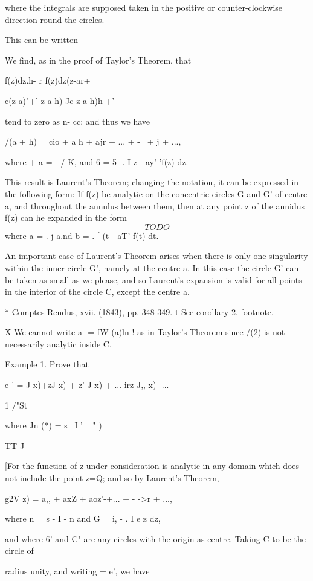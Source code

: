 {{where the integrals are supposed taken in the positive or
counter-clockwise direction round the circles.

This can be written

We find, as in the proof of Taylor's Theorem, that

f(z)dz.h- r f(z)dz(z-ar+

c(z-a)"+' z-a-h) Jc z-a-h)h +'

tend to zero as n- cc; and thus we have

/(a + h) = cio + a h + ajr + ... + -~ + j + ...,

where + a = - / K, and 6 = 5- . I z - ay'-'f(z) dz.

This result is Laurent's Theorem; changing the notation, it can be
expressed in the following form: If f(z) be analytic on the concentric
circles G and G' of centre a, and throughout the annulus between them,
then at any point z of the annidus f(z) can he expanded in the form
$$
TODO
$$
where a = . j a.nd b = . [ (t - aT' f(t) dt.

An important case of Laurent's Theorem arises when there is only one
singularity within the inner circle G', namely at the centre a. In
this case the circle G' can be taken as small as we please, and so
Laurent's expansion is valid for all points in the interior of the
circle C, except the centre a.

* Comptes Rendus, xvii. (1843), pp. 348-349. t See  corollary 2,
footnote.

X We cannot write a- = fW (a)ln ! as in Taylor's Theorem since /(2) is
not necessarily analytic inside C.

%
%

Example 1. Prove that

e ' = J x)+zJ x) + z' J x) + ...-irz-J,, x)- ...

1 /"St

where Jn (*) = s~ I ' ~ " )

 TT J

[For the function of z under consideration is analytic in any domain
which does not include the point z=Q; and so by Laurent's Theorem,

g2V z) = a,, + axZ + aoz'-+... + - ->r + ...,

where n = s - I - n and G = i, - . I e z dz,

and where 6' and C" are any circles with the origin as centre. Taking
C to be the circle of

radius unity, and writing = e', we have

}}
